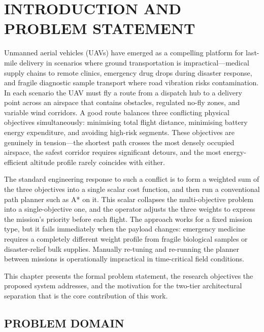 
\chapter{INTRODUCTION AND PROBLEM STATEMENT}

Unmanned aerial vehicles (UAVs) have emerged as a compelling platform for last-mile
delivery in scenarios where ground transportation is impractical---medical supply chains
to remote clinics, emergency drug drops during disaster response, and fragile diagnostic
sample transport where road vibration risks contamination. In each scenario the UAV
must fly a route from a dispatch hub to a delivery point across an airspace that contains
obstacles, regulated no-fly zones, and variable wind corridors. A good route balances
three conflicting physical objectives simultaneously: minimising total flight distance,
minimising battery energy expenditure, and avoiding high-risk segments. These objectives
are genuinely in tension---the shortest path crosses the most densely occupied airspace,
the safest corridor requires significant detours, and the most energy-efficient altitude
profile rarely coincides with either.

The standard engineering response to such a conflict is to form a weighted sum of the
three objectives into a single scalar cost function, and then run a conventional path
planner such as A* on it. This scalar collapses the multi-objective problem into a
single-objective one, and the operator adjusts the three weights to express the
mission's priority before each flight. The approach works for a fixed mission type,
but it fails immediately when the payload changes: emergency medicine requires a
completely different weight profile from fragile biological samples or disaster-relief
bulk supplies. Manually re-tuning and re-running the planner between missions is
operationally impractical in time-critical field conditions.

This chapter presents the formal problem statement, the research objectives the
proposed system addresses, and the motivation for the two-tier architectural
separation that is the core contribution of this work.

\section{PROBLEM DOMAIN}

